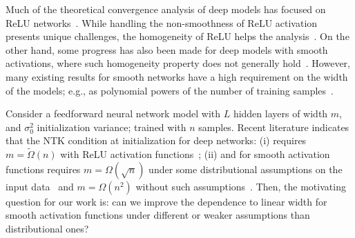 Much of the theoretical convergence analysis of deep models has focused on ReLU networks~\citep{ZAZ-YL-ZS:19,ng2021opt}. While handling the non-smoothness of ReLU activation presents unique challenges, the homogeneity of ReLU helps the analysis~\citep{ZJ-MT:19,DZ-QG:19,DZ-YC-DZ-QG:20,ZAZ-YL-ZS:19,ng2020hermite1,ng2021hermite2}. On the other hand, some progress has also been made for deep models with smooth activations, where such homogeneity property does not generally hold~\citep{SD-JL-HL-LW-XZ:19,JH-HY:20}. However, many existing results for smooth networks have a high requirement on the width of the models; e.g., as polynomial powers of the number of training samples~\citep{SD-JL-HL-LW-XZ:19}.  
%

Consider a feedforward neural network model with $L$ hidden layers of width $m$, and $\sigma_0^2$ initialization variance; trained with $n$ samples. Recent literature indicates that the NTK condition at initialization for deep networks: (i)  requires $m=\tilde{\Omega}(n)$ with ReLU activation functions~\citep{ng2021hermite2}; (ii) and for smooth activation functions requires $m = \Omega(\sqrt{n})$ under some distributional assumptions on the input data~\citep{bombari2022memorization} and $m = \Omega(n^2)$ without such assumptions~\citep{SD-JL-HL-LW-XZ:19}. Then, the motivating question for our work is: can we improve the dependence to linear width for smooth activation functions under different or weaker assumptions than distributional ones? 

